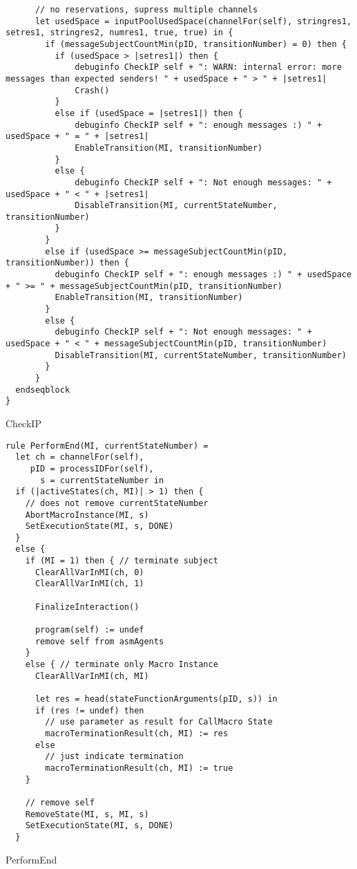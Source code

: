 \begin{listing}[H]
\begin{verbatim}
      // no reservations, supress multiple channels
      let usedSpace = inputPoolUsedSpace(channelFor(self), stringres1, setres1, stringres2, numres1, true, true) in {
        if (messageSubjectCountMin(pID, transitionNumber) = 0) then {
          if (usedSpace > |setres1|) then {
              debuginfo CheckIP self + ": WARN: internal error: more messages than expected senders! " + usedSpace + " > " + |setres1|
              Crash()
          }
          else if (usedSpace = |setres1|) then {
              debuginfo CheckIP self + ": enough messages :) " + usedSpace + " = " + |setres1|
              EnableTransition(MI, transitionNumber)
          }
          else {
              debuginfo CheckIP self + ": Not enough messages: " + usedSpace + " < " + |setres1|
              DisableTransition(MI, currentStateNumber, transitionNumber)
          }
        }
        else if (usedSpace >= messageSubjectCountMin(pID, transitionNumber)) then {
          debuginfo CheckIP self + ": enough messages :) " + usedSpace + " >= " + messageSubjectCountMin(pID, transitionNumber)
          EnableTransition(MI, transitionNumber)
        }
        else {
          debuginfo CheckIP self + ": Not enough messages: " + usedSpace + " < " + messageSubjectCountMin(pID, transitionNumber)
          DisableTransition(MI, currentStateNumber, transitionNumber)
        }
      }
  endseqblock
}
\end{verbatim}
\caption{CheckIP}
\label{lst:asm:CheckIP}
\end{listing}






\begin{listing}[H]
\begin{verbatim}
rule PerformEnd(MI, currentStateNumber) =
  let ch = channelFor(self),
     pID = processIDFor(self),
       s = currentStateNumber in
  if (|activeStates(ch, MI)| > 1) then {
    // does not remove currentStateNumber
    AbortMacroInstance(MI, s)
    SetExecutionState(MI, s, DONE)
  }
  else {
    if (MI = 1) then { // terminate subject
      ClearAllVarInMI(ch, 0)
      ClearAllVarInMI(ch, 1)

      FinalizeInteraction()

      program(self) := undef
      remove self from asmAgents
    }
    else { // terminate only Macro Instance
      ClearAllVarInMI(ch, MI)

      let res = head(stateFunctionArguments(pID, s)) in
      if (res != undef) then
        // use parameter as result for CallMacro State
        macroTerminationResult(ch, MI) := res
      else
        // just indicate termination
        macroTerminationResult(ch, MI) := true
    }

    // remove self
    RemoveState(MI, s, MI, s)
    SetExecutionState(MI, s, DONE)
  }
\end{verbatim}
\caption{PerformEnd}
\label{lst:asm:PerformEnd}
\end{listing}







